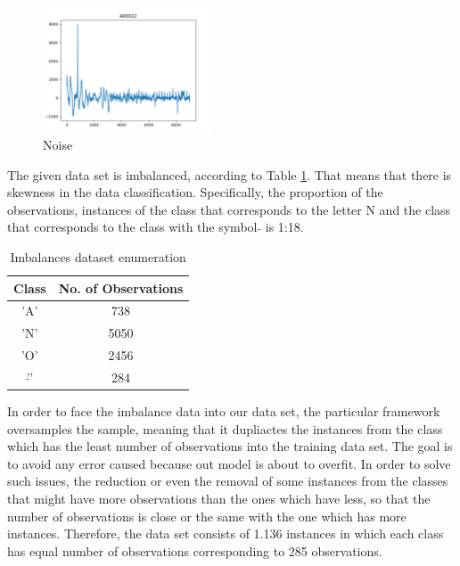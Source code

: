 \documentclass[review]{elsarticle}
\begin{document}
\begin{figure}[h!]
	\includegraphics[width=50mm,scale=0.5]{./Figures/Noise.png}
	\centering
	\caption{Noise}
	\label{fig:Noise}
\end{figure}


The given data set is imbalanced, according to Table \ref{tab:imbalanceddatasetenumeration}. That means that there is skewness in the data classification. Specifically, the proportion of the observations, instances of the class that corresponds to the letter N and the class that corresponds to the class with the symbol $\tilde{}$ is 1:18.

\begin{table}[h!]
	\caption{Imbalances dataset enumeration \label{tab:imbalanceddatasetenumeration}}
	\centering
	\begin{tabular}{cc}
		\hline
		Class & No. of Observations \\ \hline
		'A' & 738 \\
		'N' & 5050 \\
		'O' & 2456 \\
		'$\tilde{}$' & 284 \\ \hline
		
	\end{tabular}
	
\end{table}

In order to face the imbalance data into our data set, the particular framework oversamples the sample, meaning that it dupliactes the instances from the class which has the least number of observations into the training data set. The goal is to avoid any error caused because out model is about to overfit. In order to solve such issues, the reduction or even the removal of some instances from the classes that might have more observations than the ones which have less, so that the number of observations is close or the same with the one which has more instances. Therefore, the data set consists of 1.136 instances in which each class has equal number of observations corresponding to 285 observations. 
\end{document}
